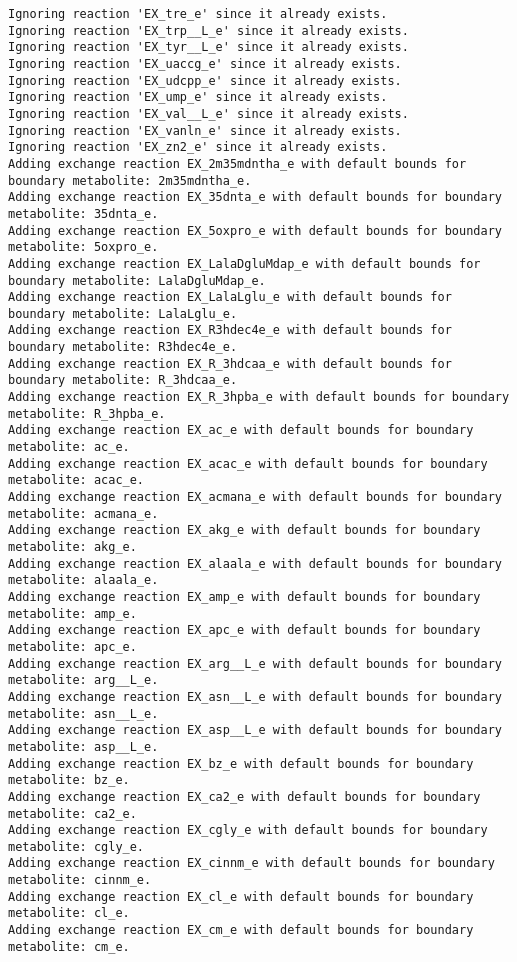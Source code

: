 \documentclass[
  letterpaper,
  DIV=11,
  numbers=noendperiod]{scrartcl}
\begin{document}
\begin{verbatim}
Ignoring reaction 'EX_tre_e' since it already exists.
Ignoring reaction 'EX_trp__L_e' since it already exists.
Ignoring reaction 'EX_tyr__L_e' since it already exists.
Ignoring reaction 'EX_uaccg_e' since it already exists.
Ignoring reaction 'EX_udcpp_e' since it already exists.
Ignoring reaction 'EX_ump_e' since it already exists.
Ignoring reaction 'EX_val__L_e' since it already exists.
Ignoring reaction 'EX_vanln_e' since it already exists.
Ignoring reaction 'EX_zn2_e' since it already exists.
Adding exchange reaction EX_2m35mdntha_e with default bounds for boundary metabolite: 2m35mdntha_e.
Adding exchange reaction EX_35dnta_e with default bounds for boundary metabolite: 35dnta_e.
Adding exchange reaction EX_5oxpro_e with default bounds for boundary metabolite: 5oxpro_e.
Adding exchange reaction EX_LalaDgluMdap_e with default bounds for boundary metabolite: LalaDgluMdap_e.
Adding exchange reaction EX_LalaLglu_e with default bounds for boundary metabolite: LalaLglu_e.
Adding exchange reaction EX_R3hdec4e_e with default bounds for boundary metabolite: R3hdec4e_e.
Adding exchange reaction EX_R_3hdcaa_e with default bounds for boundary metabolite: R_3hdcaa_e.
Adding exchange reaction EX_R_3hpba_e with default bounds for boundary metabolite: R_3hpba_e.
Adding exchange reaction EX_ac_e with default bounds for boundary metabolite: ac_e.
Adding exchange reaction EX_acac_e with default bounds for boundary metabolite: acac_e.
Adding exchange reaction EX_acmana_e with default bounds for boundary metabolite: acmana_e.
Adding exchange reaction EX_akg_e with default bounds for boundary metabolite: akg_e.
Adding exchange reaction EX_alaala_e with default bounds for boundary metabolite: alaala_e.
Adding exchange reaction EX_amp_e with default bounds for boundary metabolite: amp_e.
Adding exchange reaction EX_apc_e with default bounds for boundary metabolite: apc_e.
Adding exchange reaction EX_arg__L_e with default bounds for boundary metabolite: arg__L_e.
Adding exchange reaction EX_asn__L_e with default bounds for boundary metabolite: asn__L_e.
Adding exchange reaction EX_asp__L_e with default bounds for boundary metabolite: asp__L_e.
Adding exchange reaction EX_bz_e with default bounds for boundary metabolite: bz_e.
Adding exchange reaction EX_ca2_e with default bounds for boundary metabolite: ca2_e.
Adding exchange reaction EX_cgly_e with default bounds for boundary metabolite: cgly_e.
Adding exchange reaction EX_cinnm_e with default bounds for boundary metabolite: cinnm_e.
Adding exchange reaction EX_cl_e with default bounds for boundary metabolite: cl_e.
Adding exchange reaction EX_cm_e with default bounds for boundary metabolite: cm_e.

\end{verbatim}
\end{document}
